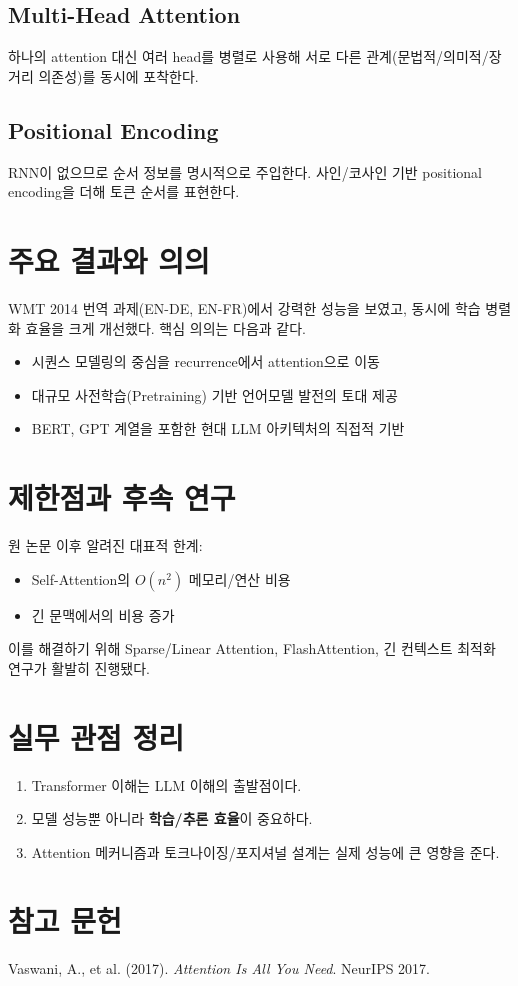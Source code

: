 \documentclass[11pt,a4paper]{article}
\begin{document}
\subsection{Multi-Head Attention}
하나의 attention 대신 여러 head를 병렬로 사용해 서로 다른 관계(문법적/의미적/장거리 의존성)를 동시에 포착한다.

\subsection{Positional Encoding}
RNN이 없으므로 순서 정보를 명시적으로 주입한다. 사인/코사인 기반 positional encoding을 더해 토큰 순서를 표현한다.

\section{주요 결과와 의의}
WMT 2014 번역 과제(EN-DE, EN-FR)에서 강력한 성능을 보였고,
동시에 학습 병렬화 효율을 크게 개선했다. 핵심 의의는 다음과 같다.
\begin{itemize}
  \item 시퀀스 모델링의 중심을 recurrence에서 attention으로 이동
  \item 대규모 사전학습(Pretraining) 기반 언어모델 발전의 토대 제공
  \item BERT, GPT 계열을 포함한 현대 LLM 아키텍처의 직접적 기반
\end{itemize}

\section{제한점과 후속 연구}
원 논문 이후 알려진 대표적 한계:
\begin{itemize}
  \item Self-Attention의 $O(n^2)$ 메모리/연산 비용
  \item 긴 문맥에서의 비용 증가
\end{itemize}
이를 해결하기 위해 Sparse/Linear Attention, FlashAttention, 긴 컨텍스트 최적화 연구가 활발히 진행됐다.

\section{실무 관점 정리}
\begin{enumerate}
  \item Transformer 이해는 LLM 이해의 출발점이다.
  \item 모델 성능뿐 아니라 \textbf{학습/추론 효율}이 중요하다.
  \item Attention 메커니즘과 토크나이징/포지셔널 설계는 실제 성능에 큰 영향을 준다.
\end{enumerate}

\section*{참고 문헌}
Vaswani, A., et al. (2017). \textit{Attention Is All You Need}. NeurIPS 2017.
\end{document}
